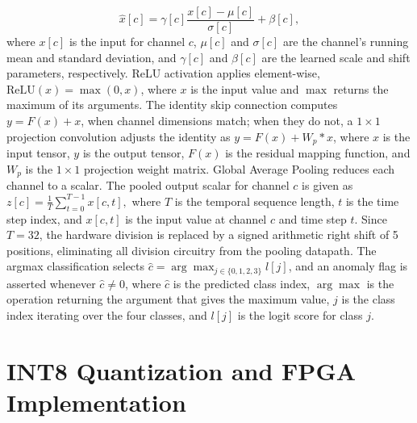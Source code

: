 \documentclass[conference]{IEEEtran}
\begin{document}
\begin{equation}
\hat{x}[c] = \gamma[c] \frac{x[c] - \mu[c]}{\sigma[c]} + \beta[c],
\label{eq:bn}
\end{equation}
where $x[c]$ is the input for channel $c$, $\mu[c]$ and $\sigma[c]$ are the channel's running mean and standard deviation, and $\gamma[c]$ and $\beta[c]$ are the learned scale and shift parameters, respectively. ReLU activation applies element-wise, $\text{ReLU}(x) = \max(0, x)$, where $x$ is the input value and $\max$ returns the maximum of its arguments. The identity skip connection computes $y = F(x) + x$, when channel dimensions match; when they do not, a $1\times1$ projection convolution adjusts the identity as $y = F(x) + W_p\ast x$, where $x$ is the input tensor, $y$ is the output tensor, $F(x)$ is the residual mapping function, and $W_p$ is the $1\times1$ projection weight matrix. Global Average Pooling reduces each channel to a scalar. The pooled output scalar for channel $c$ is given as $ z[c] = \frac{1}{T} \sum_{t=0}^{T-1} x[c, t],$
where $T$ is the temporal sequence length, $t$ is the time step index, and $x[c, t]$ is the input value at channel $c$ and time step $t$. Since $T = 32$, the hardware division is replaced by a signed arithmetic right shift of 5 positions, eliminating all division circuitry from the pooling datapath. The argmax classification selects $\hat{c} = \arg\max_{j \in \{0,1,2,3\}} l[j]$, and an anomaly flag is asserted whenever $\hat{c} \neq 0$, where $\hat{c}$ is the predicted class index, $\arg\max$ is the operation returning the argument that gives the maximum value, $j$ is the class index iterating over the four classes, and $l[j]$ is the logit score for class $j$.

\section{INT8 Quantization and FPGA Implementation}
\end{document}
